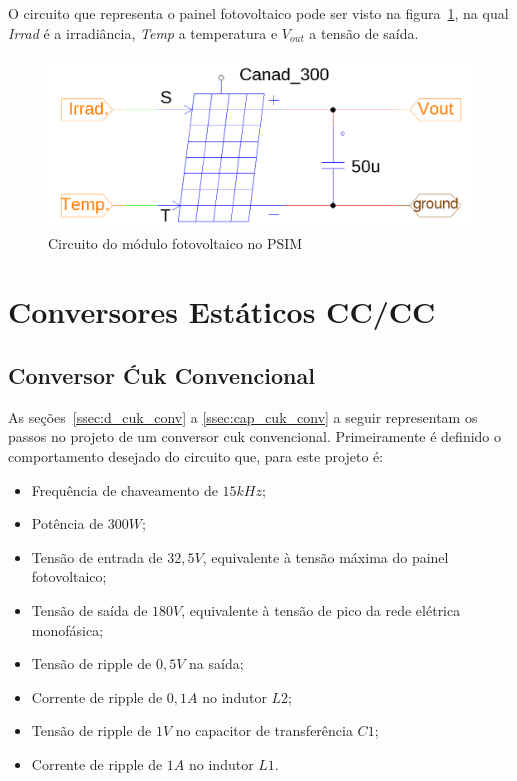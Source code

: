 \documentclass[
	12pt,				%
	openright,			%
	onseside,
	a4paper,			%
	english,			%
	french,				%
	spanish,			%
	brazil,				%
	]{abntex2}
\begin{document}
O circuito que representa o painel fotovoltaico pode ser visto na figura~\ref{fig:pv_psim_circuit}, na qual \textit{Irrad} é a irradiância, \textit{Temp} a temperatura e $V_{out}$ a tensão de saída.

\begin{figure}[htbp]%
	\begin{center}%
		\includegraphics[width=0.55 \linewidth]{pv_psim_circuit}
		\caption{Circuito do módulo fotovoltaico no PSIM}
		\label{fig:pv_psim_circuit}
	\end{center}
\end{figure}


\section{Conversores Estáticos CC/CC}

\subsection{Conversor Ćuk Convencional}

As seções~\ref{ssec:d_cuk_conv} a \ref{ssec:cap_cuk_conv} a seguir representam os passos no projeto de um conversor cuk convencional. Primeiramente é definido o comportamento desejado do circuito que, para este projeto é:

\begin{itemize}%
	\item Frequência de chaveamento de $15kHz$;
	\item Potência de $300W$;
	\item Tensão de entrada de $32,5V$, equivalente à tensão máxima do painel fotovoltaico;
	\item Tensão de saída de $180V$, equivalente à tensão de pico da rede elétrica monofásica;
	\item Tensão de ripple de $0,5V$ na saída;
	\item Corrente de ripple de $0,1A$ no indutor $L2$;
	\item Tensão de ripple de $1V$ no capacitor de transferência $C1$;
	\item Corrente de ripple de $1A$ no indutor $L1$.
\end{itemize}
\end{document}
